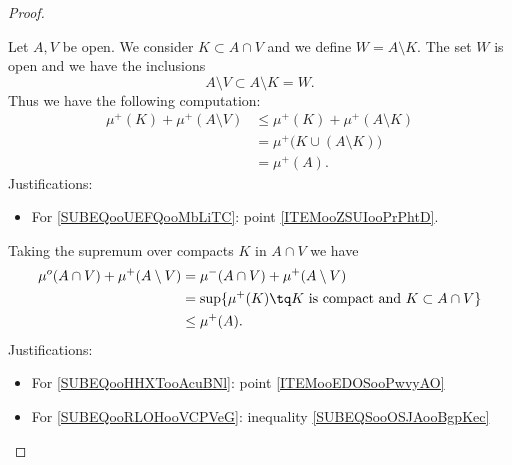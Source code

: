 \begin{proof}
\begin{subproof}
              \label{ITEMooMWJBooCHUrot}

        Let \( A,V\) be open. We consider \( K\subset A\cap V\) and we define \( W=A\setminus K\). The set \( W\) is open and we have the inclusions
        \begin{equation}
            A\setminus V\subset A\setminus K=W.
        \end{equation}
        Thus we have the following computation:
        \begin{subequations}        \label{SUBEQSooOSJAooBgpKec}
            \begin{align}
                \mu^+(K)+\mu^+(A\setminus V)&\leq \mu^+(K)+\mu^+(A\setminus K)\\
                &=\mu^+\big( K\cup (A\setminus K) \big)     \label{SUBEQooUEFQooMbLiTC}\\
                &=\mu^+(A).
            \end{align}
        \end{subequations}
        Justifications:
        \begin{itemize}
            \item For \eqref{SUBEQooUEFQooMbLiTC}: point \ref{ITEMooZSUIooPrPhtD}.
        \end{itemize}
        Taking the supremum over compacts \( K \) in \( A\cap V\) we have
        \begin{subequations}
            \begin{align}
                \mu^o(A\cap V)+\mu^+(A\setminus V)&=\mu^-(A\cap V)+\mu^+(A\setminus V)      \label{SUBEQooHHXTooAcuBNl}\\
                &=\sup\{ \mu^+(K)\tq \text{\( K\) is compact and \( K\subset A\cap V\)} \}\\
                &\leq \mu^+(A).     \label{SUBEQooRLOHooVCPVeG}
            \end{align}
        \end{subequations}
        Justifications:
        \begin{itemize}
            \item For \eqref{SUBEQooHHXTooAcuBNl}: point \ref{ITEMooEDOSooPwvyAO}
            \item For \eqref{SUBEQooRLOHooVCPVeG}: inequality \eqref{SUBEQSooOSJAooBgpKec}
        \end{itemize}


\end{subproof}
\end{proof}
